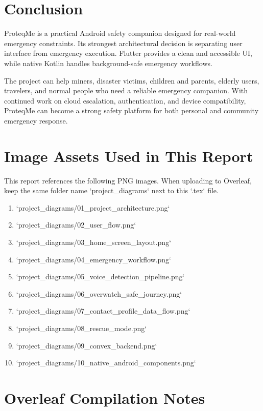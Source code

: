 \documentclass[12pt,a4paper]{report}
\newcommand{\projectname}{ProteqMe}
\begin{document}
\chapter{Conclusion}

\projectname{} is a practical Android safety companion designed for real-world emergency constraints. Its strongest architectural decision is separating user interface from emergency execution. Flutter provides a clean and accessible UI, while native Kotlin handles background-safe emergency workflows.

The project can help miners, disaster victims, children and parents, elderly users, travelers, and normal people who need a reliable emergency companion. With continued work on cloud escalation, authentication, and device compatibility, \projectname{} can become a strong safety platform for both personal and community emergency response.

\appendix

\chapter{Image Assets Used in This Report}

This report references the following PNG images. When uploading to Overleaf, keep the same folder name `project_diagrams` next to this `.tex` file.

\begin{enumerate}
    \item `project_diagrams/01_project_architecture.png`
    \item `project_diagrams/02_user_flow.png`
    \item `project_diagrams/03_home_screen_layout.png`
    \item `project_diagrams/04_emergency_workflow.png`
    \item `project_diagrams/05_voice_detection_pipeline.png`
    \item `project_diagrams/06_overwatch_safe_journey.png`
    \item `project_diagrams/07_contact_profile_data_flow.png`
    \item `project_diagrams/08_rescue_mode.png`
    \item `project_diagrams/09_convex_backend.png`
    \item `project_diagrams/10_native_android_components.png`
\end{enumerate}

\chapter{Overleaf Compilation Notes}
\end{document}

